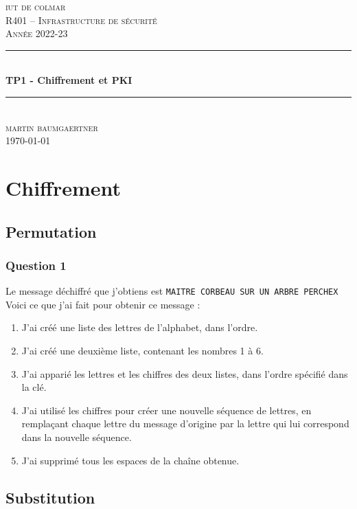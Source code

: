 \documentclass[12pt, a4paper]{article}
\begin{document}
\begin{titlepage}
	\newcommand{\HRule}{\rule{\linewidth}{0.5mm}} 
	\center 
	\textsc{\LARGE iut de colmar}\\[6.5cm] 
	\textsc{\Large R401 -- Infrastructure de sécurité}\\[0.5cm] 
	\textsc{\large Année 2022-23}\\[0.5cm]
	\HRule\\[0.75cm]
	{\huge\bfseries TP1 - Chiffrement et PKI}\\[0.4cm]
	\HRule\\[1.5cm]
	\textsc{\large martin baumgaertner}\\[6.5cm] 

	\vfill\vfill\vfill
	{\large\today} 
	\vfill
\end{titlepage}
\newpage
\tableofcontents
\newpage
\section{Chiffrement}
    \subsection{Permutation}
    \subsubsection{Question 1}
    Le message déchiffré que j'obtiens est \texttt{MAITRE CORBEAU SUR UN ARBRE PERCHEX}
    Voici ce que j'ai fait pour obtenir ce message :
    \begin{enumerate}
        \item J'ai créé une liste des lettres de l'alphabet, dans l'ordre.
        \item J'ai créé une deuxième liste, contenant les nombres 1 à 6.
        \item J'ai apparié les lettres et les chiffres des deux listes, dans l'ordre spécifié dans la clé.
        \item J'ai utilisé les chiffres pour créer une nouvelle séquence de lettres, en remplaçant chaque lettre du message d'origine par la lettre qui lui correspond dans la nouvelle séquence.
        \item J'ai supprimé tous les espaces de la chaîne obtenue.
    \end{enumerate}

    \subsection{Substitution}
\end{document}
